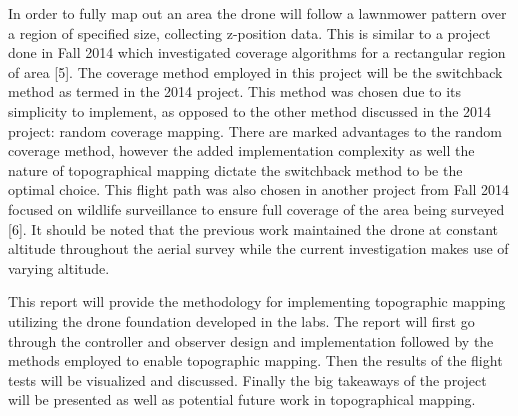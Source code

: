 In order to fully map out an area the drone will follow a lawnmower pattern over a region of specified size, collecting z-position data. This is similar to a project done in Fall 2014 which investigated coverage algorithms for a rectangular region of area [5]. The coverage method employed in this project will be the switchback method as termed in the 2014 project. This method was chosen due to its simplicity to implement, as opposed to the other method discussed in the 2014 project: random coverage mapping. There are marked advantages to the random coverage method, however the added implementation complexity as well the nature of topographical mapping dictate the switchback method to be the optimal choice. This flight path was also chosen in another project from Fall 2014 focused on wildlife surveillance to ensure full coverage of the area being surveyed [6]. It should be noted that the previous work maintained the drone at constant altitude throughout the aerial survey while the current investigation makes use of varying altitude. 

This report will provide the methodology for implementing topographic mapping utilizing the drone foundation developed in the labs. The report will first go through the controller and observer design and implementation followed by the methods employed to enable topographic mapping. Then the results of the flight tests will be visualized and discussed. Finally the big takeaways of the project will be presented as well as potential future work in topographical mapping.


